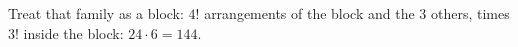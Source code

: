 Treat that family as a block: $4!$ arrangements of the block and the $3$ others, times $3!$ inside the block: $24\cdot6=\boxed{144}$.
